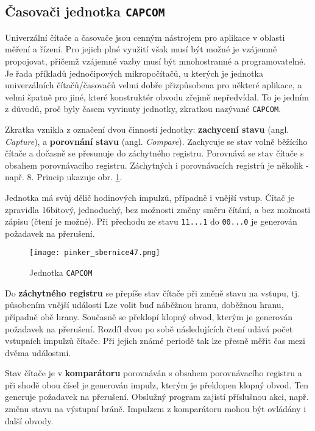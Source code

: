     \subsection{Časovači jednotka \texttt{CAPCOM}}
      Univerzální čítače a časovače jsou cenným nástrojem pro aplikace v oblasti měření a řízení. 
      Pro jejich plné využití však musí být možné je vzájemně propojovat, přičemž vzájemné vazby 
      musí být mnohostranné a programovatelné. Je řada příkladů jednočipových mikropočítačů, u 
      kterých je jednotka univerzálních čítačů/časovačů velmi dobře přizpůsobena pro některé 
      aplikace, a velmi špatně pro jiné, které konstruktér obvodu zřejmě nepředvídal. To je jedním 
      z důvodů, proč byly časem vyvinuty jednotky, zkratkou nazývané \texttt{CAPCOM}.
      
      Zkratka vznikla z označení dvou činností jednotky: \textbf{zachycení stavu} (angl. 
      \emph{Capture}), a \textbf{porovnání stavu} (angl. \emph{Compare}). Zachycuje se stav volně 
      běžícího čítače a dočasně se přesunuje do záchytného registru. Porovnává se stav čítače s 
      obsahem porovnávacího registru. Záchytných i porovnávacích registrů je několik - např. 8. 
      Princip ukazuje obr. \ref{MIT:fig_sbernice47}.
      
      Jednotka má svůj dělič hodinových impulzů, případně i vnější vstup. Čítač je zpravidla 
      16bitový, jednoduchý, bez možnosti změny směru čítání, a bez možnosti zápisu (čtení je 
      možné). Při přechodu ze stavu \texttt{11...1} do \texttt{00...0} je generován požadavek na 
      přerušení.
      
      \begin{figure}[ht!] %
        \centering
        \texttt{[image: pinker\_sbernice47.png]}
        \caption{Jednotka \texttt{CAPCOM}}
        \label{MIT:fig_sbernice47}
      \end{figure}
      
      Do \textbf{záchytného registru} se přepíše stav čítače při změně stavu na vstupu, tj. 
      působením vnější události Lze volit buď náběžnou hranu, doběžnou hranu, případně obě hrany. 
      Současně se překlopí klopný obvod, kterým je generován požadavek na přerušení. Rozdíl dvou po 
      sobě následujících čtení udává počet vstupních impulzů čítače. Při jejich známé periodě tak 
      lze přesně měřit čas mezi dvěma událostmi.
      
      Stav čítače je v \textbf{komparátoru} porovnáván s obsahem porovnávacího registru a při shodě 
      obou čísel je generován impulz, kterým je překlopen klopný obvod. Ten generuje požadavek na 
      přerušení. Obslužný program zajistí příslušnou akci, např. změnu stavu na výstupní 
      bráně. Impulzem z komparátoru mohou být ovládány i další obvody.
      
